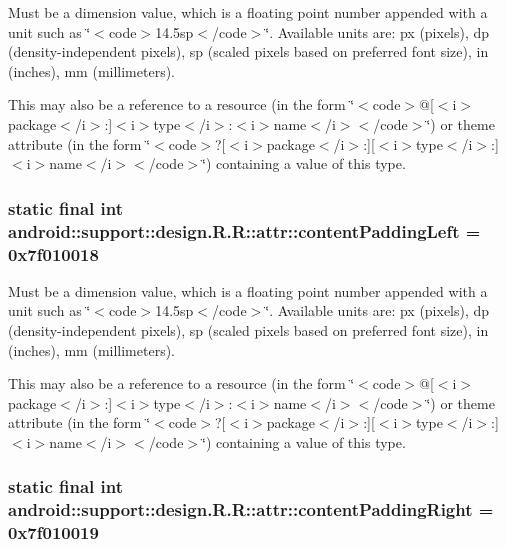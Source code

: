 Must be a dimension value, which is a floating point number appended with a unit such as \char`\"{}$<$code$>$14.5sp$<$/code$>$\char`\"{}. Available units are: px (pixels), dp (density-independent pixels), sp (scaled pixels based on preferred font size), in (inches), mm (millimeters). 

This may also be a reference to a resource (in the form \char`\"{}$<$code$>$@\mbox{[}$<$i$>$package$<$/i$>$:\mbox{]}$<$i$>$type$<$/i$>$:$<$i$>$name$<$/i$>$$<$/code$>$\char`\"{}) or theme attribute (in the form \char`\"{}$<$code$>$?\mbox{[}$<$i$>$package$<$/i$>$:\mbox{]}\mbox{[}$<$i$>$type$<$/i$>$:\mbox{]}$<$i$>$name$<$/i$>$$<$/code$>$\char`\"{}) containing a value of this type. \hypertarget{classandroid_1_1support_1_1design_1_1_r_1_1attr_2a4e48f07f306895fcb73631e981ac80}{
\subsubsection[{contentPaddingLeft}]{\setlength{\rightskip}{0pt plus 5cm}static final int android::support::design.R.R::attr::contentPaddingLeft = 0x7f010018}}
\label{classandroid_1_1support_1_1design_1_1_r_1_1attr_2a4e48f07f306895fcb73631e981ac80}


Must be a dimension value, which is a floating point number appended with a unit such as \char`\"{}$<$code$>$14.5sp$<$/code$>$\char`\"{}. Available units are: px (pixels), dp (density-independent pixels), sp (scaled pixels based on preferred font size), in (inches), mm (millimeters). 

This may also be a reference to a resource (in the form \char`\"{}$<$code$>$@\mbox{[}$<$i$>$package$<$/i$>$:\mbox{]}$<$i$>$type$<$/i$>$:$<$i$>$name$<$/i$>$$<$/code$>$\char`\"{}) or theme attribute (in the form \char`\"{}$<$code$>$?\mbox{[}$<$i$>$package$<$/i$>$:\mbox{]}\mbox{[}$<$i$>$type$<$/i$>$:\mbox{]}$<$i$>$name$<$/i$>$$<$/code$>$\char`\"{}) containing a value of this type. \hypertarget{classandroid_1_1support_1_1design_1_1_r_1_1attr_d03deaec497b2451eff6a409564d28f6}{
\subsubsection[{contentPaddingRight}]{\setlength{\rightskip}{0pt plus 5cm}static final int android::support::design.R.R::attr::contentPaddingRight = 0x7f010019}}
\label{classandroid_1_1support_1_1design_1_1_r_1_1attr_d03deaec497b2451eff6a409564d28f6}



